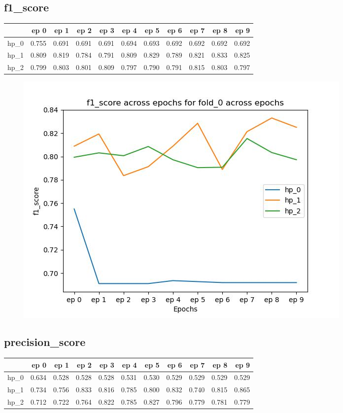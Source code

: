 \documentclass{article}
\begin{document}
\subsection{f1\_score}
\begin{tabular}{lrrrrrrrrrr}
\toprule
{} &   ep 0 &   ep 1 &   ep 2 &   ep 3 &   ep 4 &   ep 5 &   ep 6 &   ep 7 &   ep 8 &   ep 9 \\
\midrule
hp\_0 &  0.755 &  0.691 &  0.691 &  0.691 &  0.694 &  0.693 &  0.692 &  0.692 &  0.692 &  0.692 \\
hp\_1 &  0.809 &  0.819 &  0.784 &  0.791 &  0.809 &  0.829 &  0.789 &  0.821 &  0.833 &  0.825 \\
hp\_2 &  0.799 &  0.803 &  0.801 &  0.809 &  0.797 &  0.790 &  0.791 &  0.815 &  0.803 &  0.797 \\
\bottomrule
\end{tabular}

\begin{figure}[H]
\includegraphics[scale = 0.75]{fold_0/f1_score}
\end{figure}
\subsection{precision\_score}
\begin{tabular}{lrrrrrrrrrr}
\toprule
{} &   ep 0 &   ep 1 &   ep 2 &   ep 3 &   ep 4 &   ep 5 &   ep 6 &   ep 7 &   ep 8 &   ep 9 \\
\midrule
hp\_0 &  0.634 &  0.528 &  0.528 &  0.528 &  0.531 &  0.530 &  0.529 &  0.529 &  0.529 &  0.529 \\
hp\_1 &  0.734 &  0.756 &  0.833 &  0.816 &  0.785 &  0.800 &  0.832 &  0.740 &  0.815 &  0.865 \\
hp\_2 &  0.712 &  0.722 &  0.764 &  0.822 &  0.785 &  0.827 &  0.796 &  0.779 &  0.781 &  0.779 \\
\bottomrule
\end{tabular}
\end{document}
